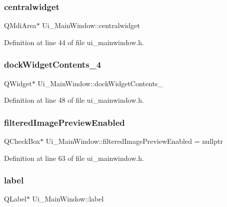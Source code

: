 \subsubsection{\texorpdfstring{centralwidget}{centralwidget}}
{\footnotesize\ttfamily Q\+Mdi\+Area$\ast$ Ui\+\_\+\+Main\+Window\+::centralwidget}



Definition at line 44 of file ui\+\_\+mainwindow.\+h.

\mbox{\label{class_ui___main_window_a9a843dd5296065a2d320fa8f083e4b59}} 
\subsubsection{\texorpdfstring{dockWidgetContents\_4}{dockWidgetContents\_4}}
{\footnotesize\ttfamily Q\+Widget$\ast$ Ui\+\_\+\+Main\+Window\+::dock\+Widget\+Contents\+\_}



Definition at line 48 of file ui\+\_\+mainwindow.\+h.

\mbox{\label{class_ui___main_window_aaeb9a0aeaf3dbd0c56283fa64b46a8ae}} 
\subsubsection{\texorpdfstring{filteredImagePreviewEnabled}{filteredImagePreviewEnabled}}
{\footnotesize\ttfamily Q\+Check\+Box$\ast$ Ui\+\_\+\+Main\+Window\+::filtered\+Image\+Preview\+Enabled = nullptr}



Definition at line 63 of file ui\+\_\+mainwindow.\+h.

\mbox{\label{class_ui___main_window_ad9c89133780f28e6efa2ec17ceb9cff5}} 
\subsubsection{\texorpdfstring{label}{label}}
{\footnotesize\ttfamily Q\+Label$\ast$ Ui\+\_\+\+Main\+Window\+::label}




